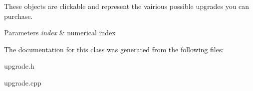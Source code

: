 These objects are clickable and represent the vairious possible upgrades you can purchase. 


\begin{DoxyParams}{Parameters}
{\em index} & numerical index \\
\hline
\end{DoxyParams}


The documentation for this class was generated from the following files\-:\begin{DoxyCompactItemize}
\item 
upgrade.\-h\item 
upgrade.\-cpp\end{DoxyCompactItemize}
